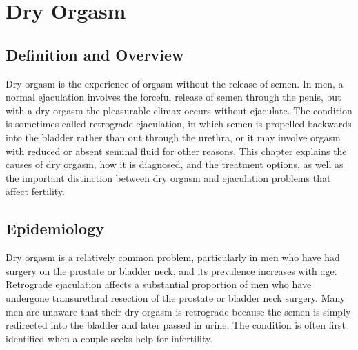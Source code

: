 \chapter{Dry Orgasm}

\section*{Definition and Overview}
Dry orgasm is the experience of orgasm without the release of semen. In men, a normal ejaculation involves the forceful release of semen through the penis, but with a dry orgasm the pleasurable climax occurs without ejaculate. The condition is sometimes called retrograde ejaculation, in which semen is propelled backwards into the bladder rather than out through the urethra, or it may involve orgasm with reduced or absent seminal fluid for other reasons. This chapter explains the causes of dry orgasm, how it is diagnosed, and the treatment options, as well as the important distinction between dry orgasm and ejaculation problems that affect fertility.

\section*{Epidemiology}
Dry orgasm is a relatively common problem, particularly in men who have had surgery on the prostate or bladder neck, and its prevalence increases with age. Retrograde ejaculation affects a substantial proportion of men who have undergone transurethral resection of the prostate or bladder neck surgery. Many men are unaware that their dry orgasm is retrograde because the semen is simply redirected into the bladder and later passed in urine. The condition is often first identified when a couple seeks help for infertility.

